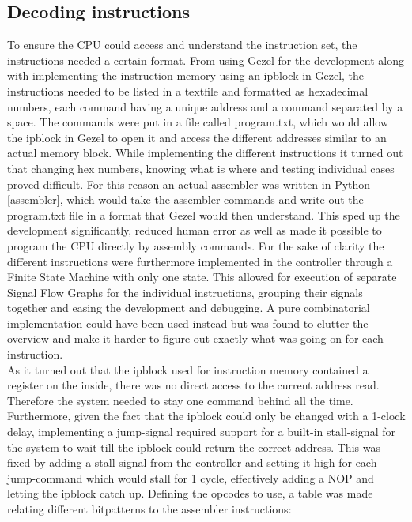 \documentclass[12pt,a4paper]{article}
\begin{document}
\subsection{Decoding instructions}
	To ensure the CPU could access and understand the instruction set, the instructions needed a certain format. From using Gezel for the development along with implementing the instruction memory using an ipblock in Gezel, the instructions needed to be listed in a textfile and formatted as hexadecimal numbers, each command having a unique address and a command separated by a space. The commands were put in a file called program.txt, which would allow the ipblock in Gezel to open it and access the different addresses similar to an actual memory block.
	While implementing the different instructions it turned out that changing hex numbers, knowing what is where and testing individual cases proved difficult. For this reason an actual assembler was written in Python \ref{assembler}, which would take the assembler commands and write out the program.txt file in a format that Gezel would then understand. This sped up the development significantly, reduced human error as well as made it possible to program the CPU directly by assembly commands.
		For the sake of clarity the different instructions were furthermore implemented in the controller through a Finite State Machine with only one state. This allowed for execution of separate Signal Flow Graphs for the individual instructions, grouping their signals together and easing the development and debugging. A pure combinatorial implementation could have been used instead but was found to clutter the overview and make it harder to figure out exactly what was going on for each instruction.\\
	As it turned out that the ipblock used for instruction memory contained a register on the inside, there was no direct access to the current address read. Therefore the system needed to stay one command behind all the time. 
	Furthermore, given the fact that the ipblock could only be changed with a 1-clock delay, implementing a jump-signal required support for a built-in stall-signal for the system to wait till the ipblock could return the correct address. This was fixed by adding a stall-signal from the controller and setting it high for each jump-command which would stall for 1 cycle, effectively adding a NOP and letting the ipblock catch up.
	Defining the opcodes to use, a table was made relating different bitpatterns to the assembler instructions:\\
	\\
\end{document}
